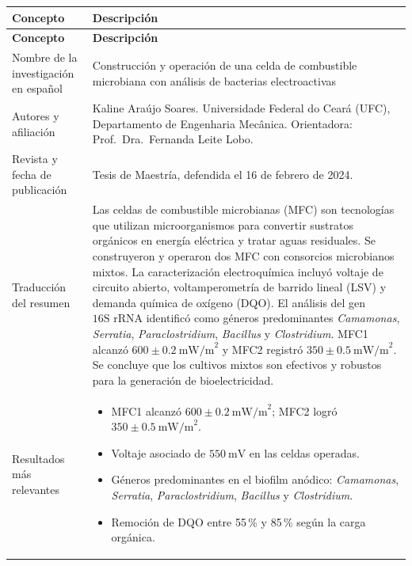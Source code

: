 \documentclass[12pt]{article}
\begin{document}
\renewcommand{\arraystretch}{1.4}
\begin{longtable}{|p{4.5cm}|p{11.5cm}|}
\hline
\textbf{Concepto} & \textbf{Descripción} \\ \hline
\endfirsthead
\hline
\textbf{Concepto} & \textbf{Descripción} \\ \hline
\endhead
\hline
\endfoot
\hline
\endlastfoot

Nombre de la investigación en español &
Construcción y operación de una celda de combustible microbiana con análisis
de bacterias electroactivas \\ \hline

Autores y afiliación &
Kaline Araújo Soares. Universidade Federal do Ceará (UFC), Departamento de
Engenharia Mecânica. Orientadora: Prof.\ Dra.\ Fernanda Leite Lobo. \\ \hline

Revista y fecha de publicación &
Tesis de Maestría, defendida el 16 de febrero de 2024. \\ \hline

Traducción del resumen &
Las celdas de combustible microbianas (MFC) son tecnologías que utilizan
microorganismos para convertir sustratos orgánicos en energía eléctrica y
tratar aguas residuales. Se construyeron y operaron dos MFC con consorcios
microbianos mixtos. La caracterización electroquímica incluyó voltaje de
circuito abierto, voltamperometría de barrido lineal (LSV) y demanda química
de oxígeno (DQO). El análisis del gen $16\text{S rRNA}$ identificó como
géneros predominantes \textit{Camamonas}, \textit{Serratia},
\textit{Paraclostridium}, \textit{Bacillus} y \textit{Clostridium}. MFC1
alcanzó $600 \pm 0.2\ \text{mW/m}^2$ y MFC2 registró
$350 \pm 0.5\ \text{mW/m}^2$. Se concluye que los cultivos mixtos son
efectivos y robustos para la generación de bioelectricidad. \\ \hline

Resultados más relevantes &
\begin{itemize}[leftmargin=0.4cm, nosep]
    \item MFC1 alcanzó $600 \pm 0.2\ \text{mW/m}^2$; MFC2 logró
          $350 \pm 0.5\ \text{mW/m}^2$.
    \item Voltaje asociado de $550\ \text{mV}$ en las celdas operadas.
    \item Géneros predominantes en el biofilm anódico: \textit{Camamonas},
          \textit{Serratia}, \textit{Paraclostridium}, \textit{Bacillus} y
          \textit{Clostridium}.
    \item Remoción de DQO entre 55\,\% y 85\,\% según la carga orgánica.
\end{itemize} \\ \hline


\end{longtable}
\end{document}
